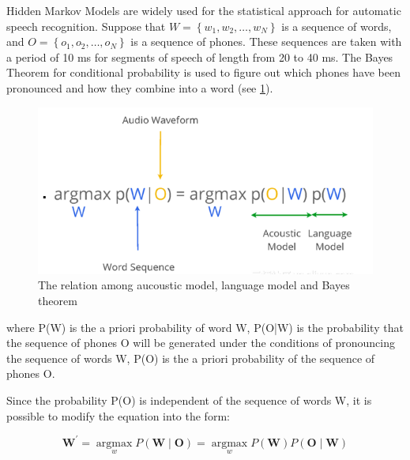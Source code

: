 Hidden Markov Models are widely used for the statistical approach for automatic speech recognition. Suppose that $W=\left\{w_{1}, w_{2}, \ldots, w_{N}\right\}$ is a sequence of words, and $O=\left\{o_{1}, o_{2}, \ldots, o_{N}\right\}$ is a sequence of phones. These sequences are taken with a period of 10 ms for segments of speech of length from 20 to 40 ms. The Bayes Theorem for conditional probability is used to figure out which phones have been pronounced and how they combine into a word (see \cref{fig:bayes}).


\begin{figure}[H]
	\centering
	\includegraphics[width=\textwidth]{img/asr_bayes.png}
	\caption{The relation among aucoustic model, language model and Bayes theorem}
	\label{fig:bayes}
\end{figure}


where P(W) is the a priori probability of word W, P(O|W) is the probability that the sequence of phones O will be generated under the conditions of pronouncing the sequence of words W, P(O) is the a priori probability of the sequence of phones O. 

Since the probability P(O) is independent of the sequence of words W, it is possible to modify the equation into the form:

\begin{equation}
    \boldsymbol{W}^{\prime}=\underset{w}{\operatorname{argmax}} P(\boldsymbol{W} \mid \boldsymbol{O})=\underset{w}{\operatorname{argmax}} P(\boldsymbol{W}) P(\boldsymbol{O} \mid \boldsymbol{W})
\end{equation}

